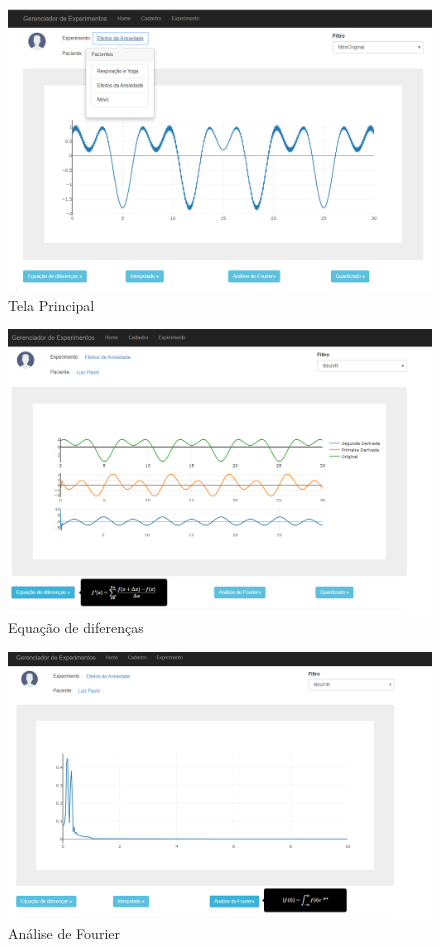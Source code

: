   \begin{figure}[h!]
	\begin{center}
		\includegraphics[width=0.8\linewidth]{images/home_lista.png}
		\caption{Tela Principal}
		\label{fig:home_lista}
	\end{center}
\end{figure}

\begin{figure}[h!]
	\begin{center}
		\includegraphics[width=0.8\linewidth]{images/home_diferencas.png}
		\caption{Equação de diferenças}
		\label{fig:home_diferencas}
	\end{center}
\end{figure}

\begin{figure}[h!]
	\begin{center}
		\includegraphics[width=0.8\linewidth]{images/home_fourier.png}
		\caption{Análise de Fourier}
		\label{fig:home_fourier}
	\end{center}
\end{figure}

